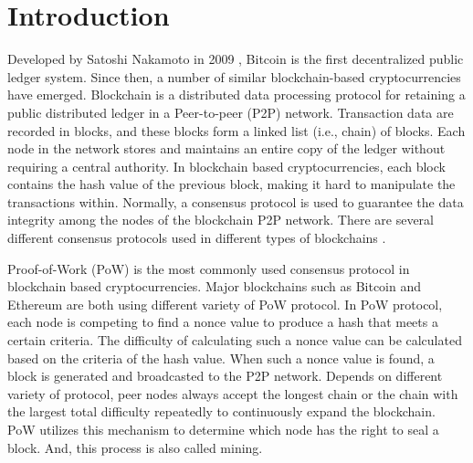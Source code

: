 \documentclass[conference]{IEEEtran}
\begin{document}
\section{Introduction}
Developed by Satoshi Nakamoto in 2009 \cite{b1}, Bitcoin is the first decentralized public ledger system. Since then, a number of similar blockchain-based cryptocurrencies have emerged. Blockchain is a distributed data processing protocol for retaining a public distributed ledger in a Peer-to-peer (P2P) network. Transaction data are recorded in blocks, and these blocks form a linked list (i.e., chain) of blocks. Each node in the network stores and maintains an entire copy of the ledger without requiring a central authority. In blockchain based cryptocurrencies, each block contains the hash value of the previous block, making it hard to manipulate the transactions within. Normally, a consensus protocol is used to guarantee the data integrity among the nodes of the blockchain P2P network. There are several different consensus protocols used in different types of blockchains \cite{b2}.

Proof-of-Work (PoW) is the most commonly used consensus protocol in blockchain based cryptocurrencies. Major blockchains such as Bitcoin and Ethereum are both using different variety of PoW protocol. In PoW protocol, each node is competing to find a nonce value to produce a hash that meets a certain criteria. The difficulty of calculating such a nonce value can be calculated based on the criteria of the hash value. When such a nonce value is found, a block is generated and broadcasted to the P2P network. Depends on different variety of protocol, peer nodes always accept the longest chain or the chain with the largest total difficulty repeatedly to continuously expand the blockchain. PoW utilizes this mechanism to determine which node has the right to seal a block. And, this process is also called mining.
\end{document}
